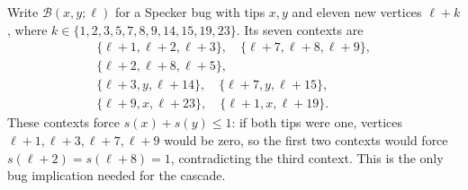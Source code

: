 \documentclass[aps,pra,reprint,superscriptaddress,longbibliography,nofootinbib,floatfix,10pt]{revtex4-2}
\theoremstyle{definition}\newtheorem{definition}[theorem]{Definition}
\theoremstyle{remark}\newtheorem{remark}[theorem]{Remark}
\begin{document}
Write $\mathcal B(x,y;\ell)$ for a Specker bug with tips $x,y$ and eleven new vertices $\ell+k$, where $k\in\{1,2,3,5,7,8,9,14,15,19,23\}$. Its seven contexts are
\begin{equation}\label{eq:roof-bug-contexts}
\begin{gathered}
\{\ell+1,\ell+2,\ell+3\},\quad
\{\ell+7,\ell+8,\ell+9\},\\
\{\ell+2,\ell+8,\ell+5\},\\
\{\ell+3,y,\ell+14\},\quad
\{\ell+7,y,\ell+15\},\\
\{\ell+9,x,\ell+23\},\quad
\{\ell+1,x,\ell+19\}.
\end{gathered}
\end{equation}
These contexts force $s(x)+s(y)\le1$: if both tips were one, vertices $\ell+1,\ell+3,\ell+7,\ell+9$ would be zero, so the first two contexts would force $s(\ell+2)=s(\ell+8)=1$, contradicting the third context. This is the only bug implication needed for the cascade.
\end{document}
